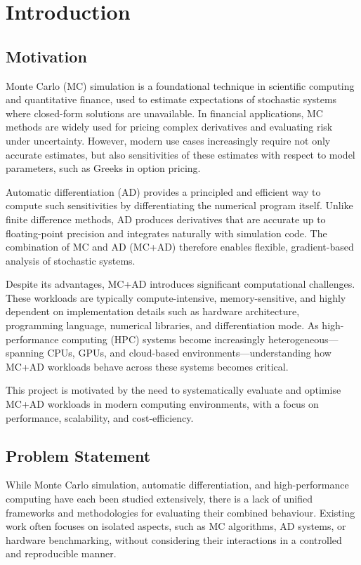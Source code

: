 \chapter{Introduction}

\section{Motivation}

Monte Carlo (MC) simulation is a foundational technique in scientific computing and quantitative finance, used to estimate expectations of stochastic systems where closed-form solutions are unavailable. In financial applications, MC methods are widely used for pricing complex derivatives and evaluating risk under uncertainty. However, modern use cases increasingly require not only accurate estimates, but also sensitivities of these estimates with respect to model parameters, such as Greeks in option pricing.

Automatic differentiation (AD) provides a principled and efficient way to compute such sensitivities by differentiating the numerical program itself. Unlike finite difference methods, AD produces derivatives that are accurate up to floating-point precision and integrates naturally with simulation code. The combination of MC and AD (MC+AD) therefore enables flexible, gradient-based analysis of stochastic systems.

Despite its advantages, MC+AD introduces significant computational challenges. These workloads are typically compute-intensive, memory-sensitive, and highly dependent on implementation details such as hardware architecture, programming language, numerical libraries, and differentiation mode. As high-performance computing (HPC) systems become increasingly heterogeneous—spanning CPUs, GPUs, and cloud-based environments—understanding how MC+AD workloads behave across these systems becomes critical.

This project is motivated by the need to systematically evaluate and optimise MC+AD workloads in modern computing environments, with a focus on performance, scalability, and cost-efficiency.

\section{Problem Statement}

While Monte Carlo simulation, automatic differentiation, and high-performance computing have each been studied extensively, there is a lack of unified frameworks and methodologies for evaluating their combined behaviour. Existing work often focuses on isolated aspects, such as MC algorithms, AD systems, or hardware benchmarking, without considering their interactions in a controlled and reproducible manner.

